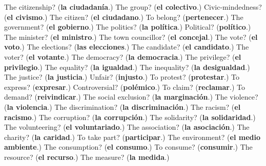 \begin{tcolorbox}[breakable,colback=teal!4,colframe=teal!35!black,title={Before you move on}]
The citizenship? (\textbf{la ciudadanía}.) The group? (\textbf{el colectivo}.) Civic-mindedness? (\textbf{el civismo}.) The citizen? (\textbf{el ciudadano}.) To belong? (\textbf{pertenecer}.) The government? (\textbf{el gobierno}.) The politics? (\textbf{la política}.) Political? (\textbf{político}.) The minister? (\textbf{el ministro}.) The town councillor? (\textbf{el concejal}.) The vote? (\textbf{el voto}.) The elections? (\textbf{las elecciones}.) The candidate? (\textbf{el candidato}.) The voter? (\textbf{el votante}.) The democracy? (\textbf{la democracia}.) The privilege? (\textbf{el privilegio}.) The equality? (\textbf{la igualdad}.) The inequality? (\textbf{la desigualdad}.) The justice? (\textbf{la justicia}.) Unfair? (\textbf{injusto}.) To protest? (\textbf{protestar}.) To express? (\textbf{expresar}.) Controversial? (\textbf{polémico}.) To claim? (\textbf{reclamar}.) To demand? (\textbf{reivindicar}.) The social exclusion? (\textbf{la marginación}.) The violence? (\textbf{la violencia}.) The discrimination? (\textbf{la discriminación}.) The racism? (\textbf{el racismo}.) The corruption? (\textbf{la corrupción}.) The solidarity? (\textbf{la solidaridad}.) The volunteering? (\textbf{el voluntariado}.) The association? (\textbf{la asociación}.) The charity? (\textbf{la caridad}.) To take part? (\textbf{participar}.) The environment? (\textbf{el medio ambiente}.) The consumption? (\textbf{el consumo}.) To consume? (\textbf{consumir}.) The resource? (\textbf{el recurso}.) The measure? (\textbf{la medida}.)
\end{tcolorbox}
